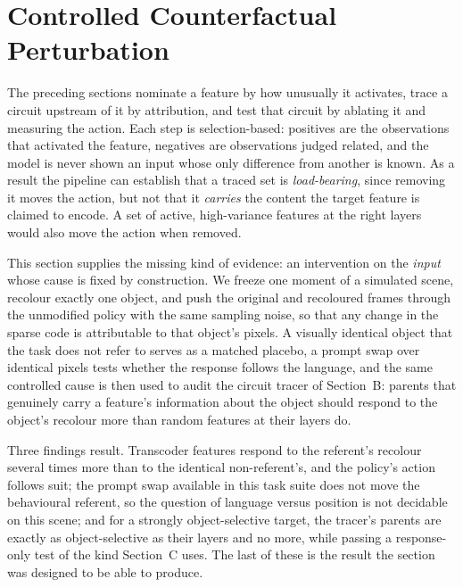 
\providecommand{\RESULT}[1]{\textbf{[#1]}}

\section{Controlled Counterfactual Perturbation}
\label{sec:counterfactual}

The preceding sections nominate a feature by how unusually it activates, trace
a circuit upstream of it by attribution, and test that circuit by ablating it
and measuring the action. Each step is selection-based: positives are the
observations that activated the feature, negatives are observations judged
related, and the model is never shown an input whose only difference from
another is known. As a result the pipeline can establish that a traced set is
\emph{load-bearing}, since removing it moves the action, but not that it
\emph{carries} the content the target feature is claimed to encode. A set of
active, high-variance features at the right layers would also move the action
when removed.

This section supplies the missing kind of evidence: an intervention on the
\emph{input} whose cause is fixed by construction. We freeze one moment of a
simulated scene, recolour exactly one object, and push the original and
recoloured frames through the unmodified policy with the same sampling noise,
so that any change in the sparse code is attributable to that object's pixels.
A visually identical object that the task does not refer to serves as a matched
placebo, a prompt swap over identical pixels tests whether the response follows
the language, and the same controlled cause is then used to audit the circuit
tracer of Section~B: parents that genuinely carry a feature's information about
the object should respond to the object's recolour more than random features
at their layers do.

Three findings result. Transcoder features respond to the referent's recolour
several times more than to the identical non-referent's, and the policy's
action follows suit; the prompt swap available in this task suite does not move
the behavioural referent, so the question of language versus position is not
decidable on this scene; and for a strongly object-selective target, the
tracer's parents are exactly as object-selective as their layers and no more,
while passing a response-only test of the kind Section~C uses. The last of
these is the result the section was designed to be able to produce.


